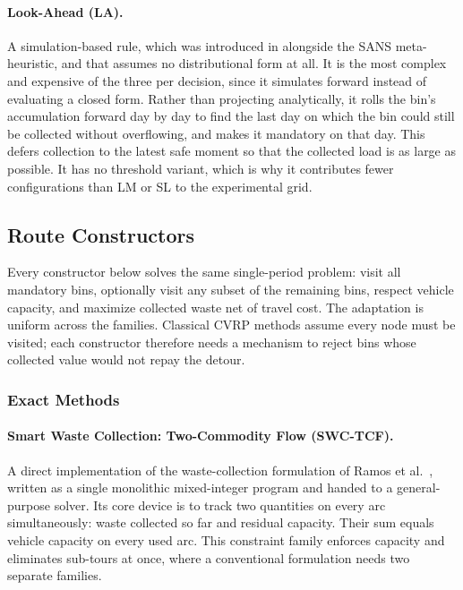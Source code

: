 \documentclass[orivec,runningheads]{llncs}
\begin{document}
\paragraph{Look-Ahead (LA).}
A simulation-based rule, which was introduced in \cite{jorge2022hybrid} alongside the SANS meta-heuristic, and that assumes no distributional form at all. It is the most complex and expensive of the three per decision, since it simulates forward instead of evaluating a closed form. Rather than
projecting analytically, it rolls the bin's accumulation forward day by day to
find the last day on which the bin could still be collected without overflowing,
and makes it mandatory on that day. This defers collection to the latest safe
moment so that the collected load is as large as possible. It has no
threshold variant, which is why it contributes fewer configurations than LM or
SL to the experimental grid.

\subsection{Route Constructors}

Every constructor below solves the same single-period problem: visit all
mandatory bins, optionally visit any subset of the remaining bins, respect
vehicle capacity, and maximize collected waste net of travel cost. The
adaptation is uniform across the families. Classical CVRP methods assume every
node must be visited; each constructor therefore needs a mechanism to reject
bins whose collected value would not repay the detour.

\subsubsection{Exact Methods}

\paragraph{Smart Waste Collection: Two-Commodity Flow (SWC-TCF).}
A direct implementation of the waste-collection formulation of Ramos et
al.~\cite{RAMOS2018146}, written as a single monolithic mixed-integer program
and handed to a general-purpose solver. Its core device is to track two
quantities on every arc simultaneously: waste collected so far and residual
capacity. Their sum equals vehicle capacity on every used arc. This constraint
family enforces capacity and eliminates sub-tours at
once, where a conventional formulation needs two separate families.
\end{document}

